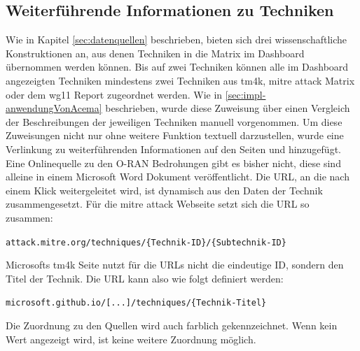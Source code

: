 \subsection{Weiterführende Informationen zu Techniken}
\par Wie in Kapitel \ref{sec:datenquellen} beschrieben, bieten sich drei wissenschaftliche Konstruktionen an, aus denen Techniken in die Matrix im Dashboard übernommen werden können. Bis auf zwei Techniken können alle im Dashboard angezeigten Techniken mindestens zwei Techniken aus \gls{tm4k}, \gls{mitre} \gls{attack} Matrix oder dem \gls{wg11} Report zugeordnet werden. Wie in \ref{sec:impl-anwendungVonAcema} beschrieben, wurde diese Zuweisung über einen Vergleich der Beschreibungen der jeweiligen Techniken manuell vorgenommen.
Um diese Zuweisungen nicht nur ohne weitere Funktion textuell darzustellen, wurde eine Verlinkung zu weiterführenden Informationen auf den Seiten \autocite{MITREATTCK} und \autocite{TacticsThreatMatrix} hinzugefügt. Eine Onlinequelle zu den O-RAN Bedrohungen gibt es bisher nicht, diese sind alleine in einem Microsoft Word Dokument veröffentlicht. Die URL, an die nach einem Klick weitergeleitet wird, ist dynamisch aus den Daten der Technik zusammengesetzt. Für die \gls{mitre} \gls{attack} Webseite setzt sich die URL so zusammen: \par \verb|attack.mitre.org/techniques/{Technik-ID}/{Subtechnik-ID}|
\par Microsofts \gls{tm4k} Seite nutzt für die URLs nicht die eindeutige ID, sondern den Titel der Technik. Die URL kann also wie folgt definiert werden: \par \verb|microsoft.github.io/[...]/techniques/{Technik-Titel}|
\par Die Zuordnung zu den Quellen wird auch farblich gekennzeichnet. Wenn kein Wert angezeigt wird, ist keine weitere Zuordnung möglich.
